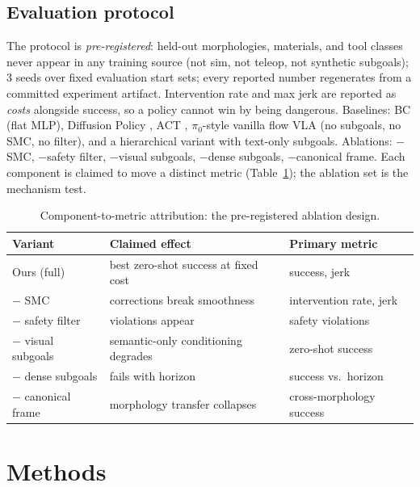 \documentclass[11pt,a4paper]{article}
\begin{document}
\subsection{Evaluation protocol}
\label{sec:eval}
The protocol is \emph{pre-registered}: held-out morphologies, materials, and tool
classes never appear in any training source (not sim, not teleop, not synthetic
subgoals); 3 seeds over fixed evaluation start sets; every reported number
regenerates from a committed experiment artifact. Intervention rate and max jerk
are reported as \emph{costs} alongside success, so a policy cannot win by being
dangerous. Baselines: BC (flat MLP), Diffusion Policy \cite{diffusionpolicy},
ACT \cite{act}, $\pi_0$-style vanilla flow VLA (no subgoals, no SMC, no filter),
and a hierarchical variant with text-only subgoals. Ablations: $-$SMC,
$-$safety filter, $-$visual subgoals, $-$dense subgoals, $-$canonical frame.
Each component is claimed to move a distinct metric (Table~\ref{tab:abl}); the
ablation set is the mechanism test.

\begin{table}[t]
\centering
\caption{Component-to-metric attribution: the pre-registered ablation design.}
\label{tab:abl}
\begin{tabular}{@{}lll@{}}
\toprule
Variant & Claimed effect & Primary metric \\
\midrule
Ours (full) & best zero-shot success at fixed cost & success, jerk \\
$-$ SMC & corrections break smoothness & intervention rate, jerk \\
$-$ safety filter & violations appear & safety violations \\
$-$ visual subgoals & semantic-only conditioning degrades & zero-shot success \\
$-$ dense subgoals & fails with horizon & success vs.\ horizon \\
$-$ canonical frame & morphology transfer collapses & cross-morphology success \\
\bottomrule
\end{tabular}
\end{table}

\section{Methods}
\label{sec:methods}
\end{document}
